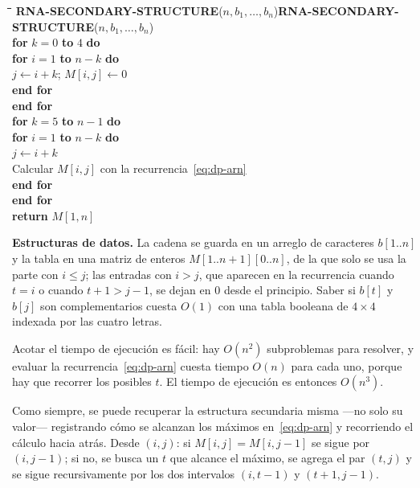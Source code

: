 \documentclass[12pt, spanish, oneside, openany]{book}
\newcommand{\pl}[1]{\makebox[1.6em][r]{\texttt{\footnotesize #1}}\hspace{0.9em}}
\newenvironment{pseudo}[1]{%
  \begin{center}%
  \begin{mdframed}[style=pseudobox]%
  \small
  \begin{tabbing}%
  \hspace{2.5em}\=\hspace{1.5em}\=\hspace{1.5em}\=\hspace{1.5em}\=\hspace{1.5em}\=\kill
  \def\pseudotitulo{#1}\ifx\pseudotitulo\empty\else#1\\[3pt]\fi}%
  {\end{tabbing}\end{mdframed}\end{center}}
\newenvironment{estructuras}%
  {\begin{center}\begin{minipage}{0.93\textwidth}\begin{mdframed}[style=estrbox]%
   \small\textbf{Estructuras de datos.}\;}%
  {\end{mdframed}\end{minipage}\end{center}}
\theoremstyle{uprightplain}
\theoremstyle{definition}
\theoremstyle{remark}
\theoremstyle{definition}
\begin{document}
\begin{pseudo}{\textbf{RNA-SECONDARY-STRUCTURE}($n, b_1,\dots,b_n$)}
\pl{1}\> \textbf{for} $k = 0$ \textbf{to} $4$ \textbf{do}\\
\pl{2}\>\> \textbf{for} $i = 1$ \textbf{to} $n-k$ \textbf{do}\\
\pl{3}\>\>\> $j \leftarrow i+k$; \quad $M[i,j] \leftarrow 0$\\
\pl{4}\>\> \textbf{end for}\\
\pl{5}\> \textbf{end for}\\
\pl{6}\> \textbf{for} $k = 5$ \textbf{to} $n-1$ \textbf{do}\\
\pl{7}\>\> \textbf{for} $i = 1$ \textbf{to} $n-k$ \textbf{do}\\
\pl{8}\>\>\> $j \leftarrow i+k$\\
\pl{9}\>\>\> Calcular $M[i,j]$ con la recurrencia~\eqref{eq:dp-arn}\\
\pl{10}\>\> \textbf{end for}\\
\pl{11}\> \textbf{end for}\\
\pl{12}\> \textbf{return} $M[1,n]$
\end{pseudo}

\begin{estructuras}
La cadena se guarda en un arreglo de caracteres $b[1..n]$ y la tabla en una
matriz de enteros $M[1..n+1][0..n]$, de la que solo se usa la parte con
$i\le j$; las entradas con $i>j$, que aparecen en la recurrencia cuando $t=i$
o cuando $t+1>j-1$, se dejan en $0$ desde el principio. Saber si $b[t]$ y
$b[j]$ son complementarios cuesta $O(1)$ con una tabla booleana de $4\times 4$
indexada por las cuatro letras.
\end{estructuras}

Acotar el tiempo de ejecución es fácil: hay $O(n^2)$ subproblemas para resolver, y evaluar la recurrencia~\eqref{eq:dp-arn} cuesta tiempo $O(n)$ para cada uno, porque hay que recorrer los posibles $t$. El tiempo de ejecución es entonces $O(n^3)$.

Como siempre, se puede recuperar la estructura secundaria misma ---no solo su valor--- registrando cómo se alcanzan los máximos en~\eqref{eq:dp-arn} y recorriendo el cálculo hacia atrás. Desde $(i,j)$: si $M[i,j]=M[i,j-1]$ se sigue por $(i,j-1)$; si no, se busca un $t$ que alcance el máximo, se agrega el par $(t,j)$ y se sigue recursivamente por los dos intervalos $(i,t-1)$ y $(t+1,j-1)$.
\end{document}
